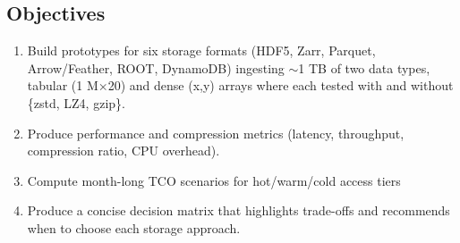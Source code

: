 \documentclass{article}
\begin{document}
\subsection{Objectives}
\begin{enumerate}
    \item Build prototypes for six storage formats (HDF5, Zarr, Parquet, Arrow/Feather, ROOT, DynamoDB) ingesting $\sim$1 TB of two data types, tabular (1 M×20) and dense (x,y) arrays where each tested with and without \{zstd, LZ4, gzip\}.
    \item Produce performance and compression metrics (latency, throughput, compression ratio, CPU overhead).
    \item Compute month-long TCO scenarios for hot/warm/cold access tiers
    \item Produce a concise decision matrix that highlights trade-offs and recommends when to choose each storage approach.
\end{enumerate}
\end{document}
